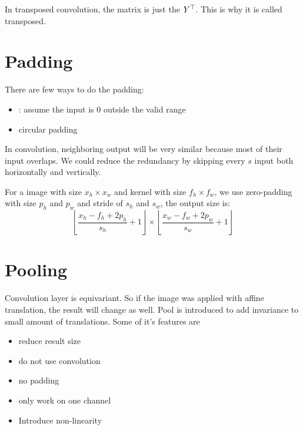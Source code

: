 In transposed convolution, the matrix is just the ${Y}^\top$. This is why it is called transposed.



\section{Padding}

There are few ways to do the padding:
\begin{itemize}
    \item {}: assume the input is $0$ outside the valid range
    \item circular padding
\end{itemize}

\begin{definition}
    In convolution, neighboring output will be very similar because most of their input overlaps. We could reduce the redundancy by skipping every $s$ input both horizontally and vertically.
\end{definition}

\begin{theorem}
    For a image with size $x_h \times x_w$ and kernel with size $f_h \times f_w$, we use zero-padding with size $p_h$ and $p_w$ and stride of $s_h$ and $s_w$, the output size is:
    \begin{equation}
        \left\lfloor \frac{x_h - f_h + 2p_h}{s_h} + 1 \right\rfloor \times \left\lfloor \frac{x_w - f_w + 2p_w}{s_w} + 1 \right\rfloor
    \end{equation}
\end{theorem}



\section{Pooling}

Convolution layer is equivariant. So if the image was applied with affine translation, the result will change as well. Pool is introduced to add invariance to small amount of translations. Some of it's features are
\begin{itemize}
    \item reduce result size
    \item do not use convolution
    \item no padding
    \item only work on one channel
    \item Introduce non-linearity
\end{itemize}

